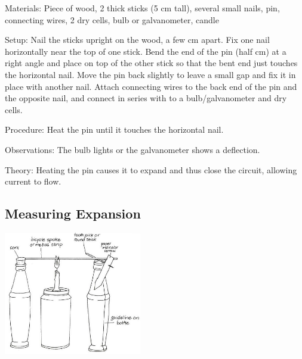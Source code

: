 \begin{multicols}{2}
\begin{description*}
\item[Materials:]{Piece of wood, 2 thick sticks (5 cm tall), several small nails, pin, connecting wires, 2 dry cells, bulb or galvanometer, candle}
\item[Setup:]{Nail the sticks upright on the wood, a few cm apart. Fix one nail horizontally near the top of one stick. Bend the end of the pin (half cm) at a right angle and place on top of the other stick so that the bent end just touches the horizontal nail. Move the pin back slightly to leave a small gap and fix it in place with another nail. Attach connecting wires to the back end of the pin and the opposite nail, and connect in series with to a bulb/galvanometer and dry cells.}
\item[Procedure:]{Heat the pin until it touches the horizontal nail.}
\item[Observations:]{The bulb lights or the galvanometer shows a deflection.}
\item[Theory:]{Heating the pin causes it to expand and thus close the circuit, allowing current to flow.}
\end{description*}

\subsection{Measuring Expansion}

\begin{center}
\includegraphics[width=0.45\textwidth]{./img/vso/measuring-expansion.png}
\end{center}


\end{multicols}
